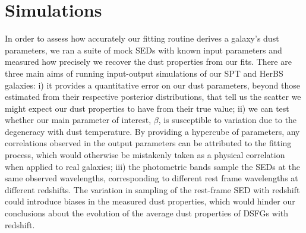 \section{Simulations}
\label{sec:simulations}

In order to assess how accurately our fitting routine derives a galaxy's dust parameters, we ran a suite of mock SEDs with known input parameters and measured how precisely we recover the dust properties from our fits. There are three main aims of running input-output simulations of our SPT and HerBS galaxies: i) it provides a quantitative error on our dust parameters, beyond those estimated from their respective posterior distributions, that tell us the scatter we might expect our dust properties to have from their true value; ii) we can test whether our main parameter of interest, $\beta$, is susceptible to variation due to the degeneracy with dust temperature. By providing a hypercube of parameters, any correlations observed in the output parameters can be attributed to the fitting process, which would otherwise be mistakenly taken as a physical correlation when applied to real galaxies; iii) the photometric bands sample the SEDs at the same observed wavelengths, corresponding to different rest frame wavelengths at different redshifts. The variation in sampling of the rest-frame SED with redshift could introduce biases in the measured dust properties, which would hinder our conclusions about the evolution of the average dust properties of DSFGs with redshift.

